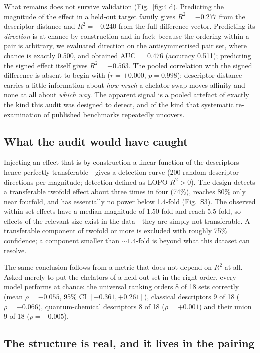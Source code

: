 What remains does not survive validation (Fig.~\ref{fig:4}d). Predicting the magnitude of the effect in a held-out target family gives $R^2 = -0.277$ from the descriptor distance and $R^2 = -0.240$ from the full difference vector. Predicting its \emph{direction} is at chance by construction and in fact: because the ordering within a pair is arbitrary, we evaluated direction on the antisymmetrised pair set, where chance is exactly 0.500, and obtained AUC $= 0.476$ (accuracy 0.511); predicting the signed effect itself gives $R^2 = -0.563$. The pooled correlation with the signed difference is absent to begin with ($r = +0.000$, $p = 0.998$): descriptor distance carries a little information about \emph{how much} a chelator swap moves affinity and none at all about \emph{which way}. The apparent signal is a pooled artefact of exactly the kind this audit was designed to detect, and of the kind that systematic re-examination of published benchmarks repeatedly uncovers.\cite{Schuh2026Audit,McGreivy2024Weak}

\subsection{What the audit would have caught}

Injecting an effect that is by construction a linear function of the descriptors---hence perfectly transferable---gives a detection curve (200 random descriptor directions per magnitude; detection defined as LOPO $R^2 > 0$). The design detects a transferable twofold effect about three times in four (74\%), reaches 80\% only near fourfold, and has essentially no power below 1.4-fold (Fig.~S3). The observed within-set effects have a median magnitude of 1.50-fold and reach 5.5-fold, so effects of the relevant size exist in the data---they are simply not transferable. A transferable component of twofold or more is excluded with roughly 75\% confidence; a component smaller than ${\sim}1.4$-fold is beyond what this dataset can resolve.

The same conclusion follows from a metric that does not depend on $R^2$ at all. Asked merely to put the chelators of a held-out set in the right order, every model performs at chance: the universal ranking orders 8 of 18 sets correctly (mean $\rho = -0.055$, 95\% CI $[-0.361, +0.261]$), classical descriptors 9 of 18 ($\rho = -0.066$), quantum-chemical descriptors 8 of 18 ($\rho = +0.001$) and their union 9 of 18 ($\rho = -0.005$).

\subsection{The structure is real, and it lives in the pairing}

